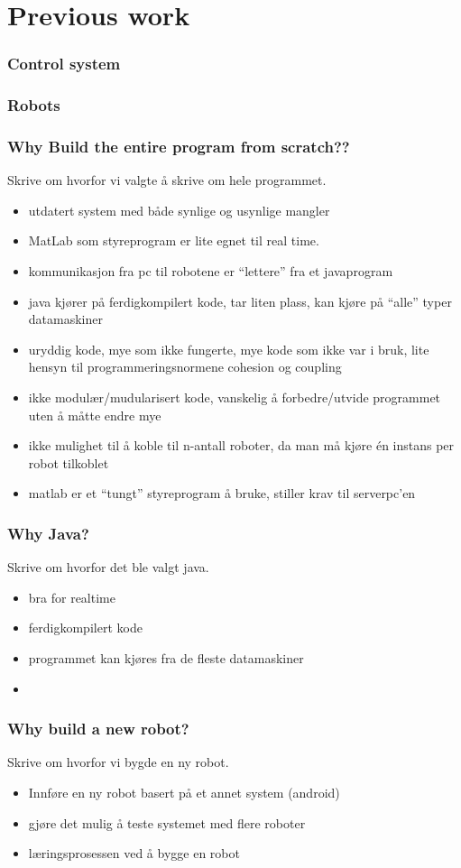 \section{Previous work}
\subsubsection{Control system}
\subsubsection{Robots}

\subsubsection{Why Build the entire program from scratch??}
Skrive om hvorfor vi valgte å skrive om hele programmet.

\begin{itemize}
    \item utdatert system med både synlige og usynlige mangler
    \item MatLab som styreprogram er lite egnet til real time.
    \item kommunikasjon fra pc til robotene er ``lettere'' fra et javaprogram
    \item java kjører på ferdigkompilert kode, tar liten plass, kan kjøre på ``alle'' typer datamaskiner
    \item uryddig kode, mye som ikke fungerte, mye kode som ikke var i bruk, lite hensyn til programmeringsnormene cohesion og coupling
    \item ikke modulær/mudularisert kode, vanskelig å forbedre/utvide programmet uten å måtte endre mye
    \item ikke mulighet til å koble til n-antall roboter, da man må kjøre én instans per robot tilkoblet
    \item matlab er et ``tungt'' styreprogram å bruke, stiller krav til serverpc'en
\end{itemize}

\subsubsection{Why Java?}
Skrive om hvorfor det ble valgt java.

\begin{itemize}
    \item bra for realtime
    \item ferdigkompilert kode
    \item programmet kan kjøres fra de fleste datamaskiner
    \item 
\end{itemize}

\subsubsection{Why build a new robot?}
Skrive om hvorfor vi bygde en ny robot.

\begin{itemize}
    \item Innføre en ny robot basert på et annet system (android)
    \item gjøre det mulig å teste systemet med flere roboter
    \item læringsprosessen ved å bygge en robot
\end{itemize}

